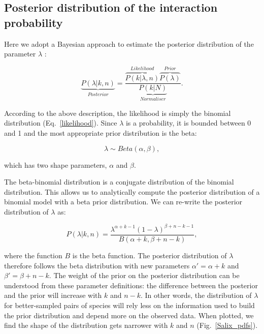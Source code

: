 \documentclass[12pt]{article}
\begin{document}
\begin{spacing}{2.0}
    \subsection*{Posterior distribution of the interaction probability}

      Here we adopt a Bayesian approach to estimate the posterior distribution of the parameter $\lambda$ :

      \begin{equation}
        \underbrace{P(\lambda|k,n)}_{Posterior} = \frac{\overbrace{P(k|\lambda,n)}^{Likelihood}\overbrace{P(\lambda)}^{Prior}}{\underbrace{P(k|N)}_{Normaliser}} .
        \label{posterior}
      \end{equation}

      According to the above description, the likelihood is simply the binomial distribution (Eq.~\ref{likelihood}). Since $\lambda$ is a probability, it is bounded between 0 and 1 and the most appropriate prior distribution is the beta:

      \begin{equation}
        \lambda \sim Beta(\alpha,\beta) , \label{prior}
      \end{equation}

      \noindent which has two shape parameters, $\alpha$ and $\beta$. 

     The beta-binomial distribution is a conjugate distribution of the binomial distribution. This allows us to analytically compute the posterior distribution of a binomial model with a beta prior distribution. We can re-write the posterior distribution of $\lambda$ as:

      \begin{equation}
        P(\lambda|k,n) = \frac{\lambda^{\alpha+k-1}(1-\lambda)^{\beta+n-k-1}}{B(\alpha+k,\beta+n-k)} , \label{posterior}
      \end{equation}

      
      \noindent where the function $B$ is the beta function. The posterior distribution of $\lambda$ therefore follows the beta distribution with new parameters $\alpha'= \alpha+k$ and $\beta'=\beta+n-k$. The weight of the prior on the posterior distribution can be understood from these parameter definitions: the difference between the posterior and the prior will increase with $k$ and $n-k$. In other words, the distribution of $\lambda$ for better-sampled pairs of species will rely less on the information used to build the prior distribution and depend more on the observed data.
      When plotted, we find the shape of the distribution gets narrower with $k$ and $n$ (Fig.~\ref{Salix_pdfs}). 


\end{spacing}
\end{document}
